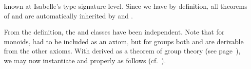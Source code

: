 \begin{isabellebody}
\begin{isamarkuptext}
  known at Isabelle's type signature level.  Since we have  by definition, all theorems of  and  are automatically inherited by  and .%
\end{isamarkuptext}%
\isamarkuptrue%
%
\isamarkuptrue%
%
\begin{isamarkuptext}%
From the definition, the  and  classes
  have been independent.  Note that for monoids, 
  had to be included as an axiom, but for groups both  and  are derivable from the other
  axioms.  With  derived as a theorem of group
  theory (see page~\pageref{thm:group-right-unit}), we may now
  instantiate  and  properly as follows (cf.\ ).


\end{isamarkuptext}
\end{isabellebody}
